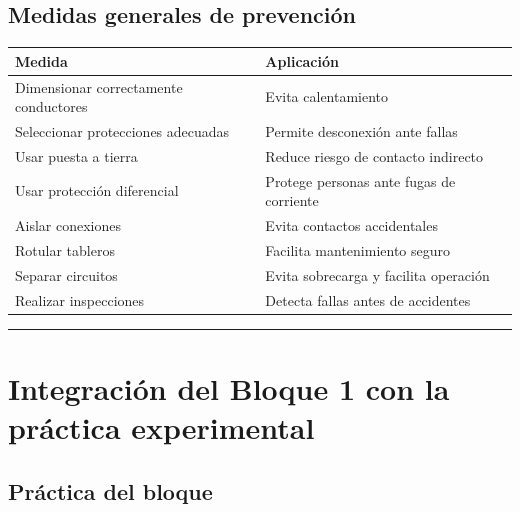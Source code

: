 \documentclass[
  spanish,
  letterpaper,
  DIV=11,
  numbers=noendperiod]{scrreprt}
\newcounter{none} %
\begin{document}
\subsection{Medidas generales de
prevención}\label{medidas-generales-de-prevenciuxf3n}

{\def\LTcaptype{none} %
\begin{longtable}[]{@{}
  >{\raggedright\arraybackslash}p{}
  >{\raggedright\arraybackslash}p{}@{}}
\toprule\noalign{}
\begin{minipage}[b]{\linewidth}\raggedright
Medida
\end{minipage} & \begin{minipage}[b]{\linewidth}\raggedright
Aplicación
\end{minipage} \\
\midrule\noalign{}
\endhead
\bottomrule\noalign{}
\endlastfoot
Dimensionar correctamente conductores & Evita calentamiento \\
Seleccionar protecciones adecuadas & Permite desconexión ante fallas \\
Usar puesta a tierra & Reduce riesgo de contacto indirecto \\
Usar protección diferencial & Protege personas ante fugas de
corriente \\
Aislar conexiones & Evita contactos accidentales \\
Rotular tableros & Facilita mantenimiento seguro \\
Separar circuitos & Evita sobrecarga y facilita operación \\
Realizar inspecciones & Detecta fallas antes de accidentes \\
\end{longtable}
}

\begin{center}\rule{0.5\linewidth}{0.5pt}\end{center}

\section{Integración del Bloque 1 con la práctica
experimental}\label{integraciuxf3n-del-bloque-1-con-la-pruxe1ctica-experimental}

\subsection{Práctica del bloque}\label{pruxe1ctica-del-bloque}
\end{document}
